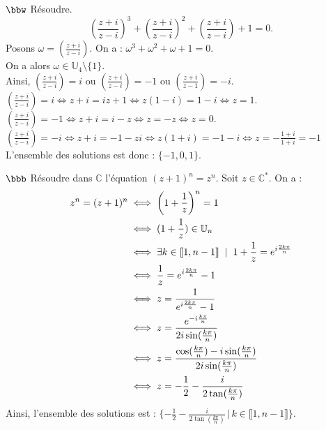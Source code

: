 \documentclass[11pt]{article}
\begin{document}
\begin{exercice}{$\bbw$}{}
    Résoudre.
    \begin{equation*}
        \left( \frac{z+i}{z-i} \right)^3 + \left( \frac{z+i}{z-i} \right)^2 + \left( \frac{z+i}{z-i} \right) + 1 = 0.
    \end{equation*}
    \tcblower
    Posons $\omega=\left( \frac{z+i}{z-i} \right)$. On a : $\omega^3 + \omega^2 + \omega + 1 = 0$.\\
    On a alors $\omega\in\mathbb{U}_4 \setminus \{1\}$.\\
    Ainsi, $\left( \frac{z+i}{z-i} \right)=i$ ou $\left( \frac{z+i}{z-i} \right) = -1$ ou $\left( \frac{z+i}{z-1} \right) = -i$.\\
     $\left( \frac{z+i}{z-i} \right)=i\iff z+i = iz+1 \iff z(1 - i) = 1 - i \iff z = 1$.\\
     $\left( \frac{z+i}{z-i} \right)=-1 \iff z+i = i - z \iff z = -z \iff z = 0$.\\
     $\left( \frac{z+i}{z-i} \right)=-i \iff z+i = -1 - zi \iff z(1+i) = -1 - i \iff z=-\frac{1+i}{1+i}=-1$\\
    L'ensemble des solutions est donc : $\{-1, 0, 1\}$.
\end{exercice}

\begin{exercice}{$\bbb$}{}
    Résoudre dans $\mathbb{C}$ l'équation $(z+1)^n=z^n$.
    \tcblower
    Soit $z\in\mathbb{C}^*$. On a :
    \begin{align*}
        z^n=(z+1)^n &\iff \left(1+\frac{1}{z}\right)^n=1\\
        &\iff(1+\frac{1}{z})\in\mathbb{U}_n\\
        &\iff\exists k\in\llbracket1,n-1\rrbracket \hspace{0.2cm} | \hspace{0.2cm} 1+\frac{1}{z}=e^{i\frac{2k\pi}{n}}\\
        &\iff\frac{1}{z}=e^{i\frac{2k\pi}{n}}-1\\
        &\iff z=\frac{1}{e^{i\frac{2k\pi}{n}}-1}\\
        &\iff z=\frac{e^{-i\frac{k\pi}{n}}}{2i\sin(\frac{k\pi}{n})}\\
        &\iff z=\frac{\cos(\frac{k\pi}{n})-i\sin(\frac{k\pi}{n})}{2i\sin(\frac{k\pi}{n})}\\
        &\iff z=-\frac{1}{2}-\frac{i}{2\tan(\frac{k\pi}{n})}
    \end{align*}
    Ainsi, l'ensemble des solutions est : $\{-\frac{1}{2}-\frac{i}{2\tan(\frac{k\pi}{n})} \, | \, k\in\llbracket1,n-1\rrbracket\}$.
\end{exercice}
\end{document}
